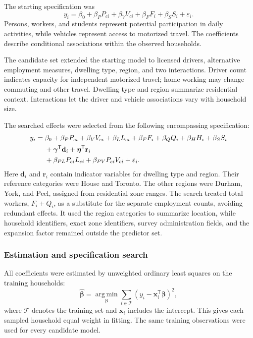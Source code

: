 The starting specification was
\begin{equation}
 y_i=\beta_0+\beta_P P_{ci}+\beta_V V_{ci}
       +\beta_F F_i+\beta_S S_i+\varepsilon_i.
 \label{eq:simple-model}
\end{equation}
Persons, workers, and students represent potential participation in daily activities, while vehicles represent access to motorized travel. The coefficients describe conditional associations within the observed households.

The candidate set extended the starting model to licensed drivers, alternative employment measures, dwelling type, region, and two interactions. Driver count indicates capacity for independent motorized travel; home working may change commuting and other travel. Dwelling type and region summarize residential context. Interactions let the driver and vehicle associations vary with household size.

The searched effects were selected from the following encompassing specification:
\begin{align}
 y_i={}&\beta_0+\beta_P P_{ci}+\beta_V V_{ci}+\beta_L L_{ci}
       +\beta_F F_i+\beta_Q Q_i+\beta_H H_i+\beta_S S_i \notag\\
      &+\boldsymbol{\gamma}^{\mathsf T}\mathbf d_i
       +\boldsymbol{\eta}^{\mathsf T}\mathbf r_i \notag\\
      &+\beta_{PL}P_{ci}L_{ci}+\beta_{PV}P_{ci}V_{ci}
       +\varepsilon_i.
 \label{eq:alternative-model}
\end{align}
Here $\mathbf d_i$ and $\mathbf r_i$ contain indicator variables for dwelling type and region. Their reference categories were House and Toronto. The other regions were Durham, York, and Peel, assigned from residential zone ranges. The search treated total workers, $F_i+Q_i$, as a substitute for the separate employment counts, avoiding redundant effects. It used the region categories to summarize location, while household identifiers, exact zone identifiers, survey administration fields, and the expansion factor remained outside the predictor set.

\subsubsection{Estimation and specification search}
All coefficients were estimated by unweighted ordinary least squares on the training households:
\begin{equation}
 \widehat{\boldsymbol\beta}
 =\underset{\boldsymbol\beta}{\operatorname{arg\,min}}
   \sum_{i\in\mathcal T}(y_i-\mathbf x_i^{\mathsf T}\boldsymbol\beta)^2,
 \label{eq:ols}
\end{equation}
where $\mathcal T$ denotes the training set and $\mathbf x_i$ includes the intercept. This gives each sampled household equal weight in fitting. The same training observations were used for every candidate model.

